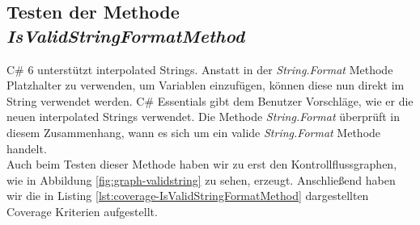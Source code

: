 \subsection{Testen der Methode \textit{IsValidStringFormatMethod}}
C\# 6 unterstützt interpolated Strings. Anstatt in der \textit{String.Format} Methode Platzhalter zu verwenden, um Variablen einzufügen, können diese nun direkt im String verwendet werden.\cite{csharp6} C\# Essentials gibt dem Benutzer Vorschläge, wie er die neuen interpolated Strings verwendet. Die Methode \textit{String.Format} überprüft in diesem Zusammenhang, wann es sich um ein valide \textit{String.Format} Methode handelt.\\
Auch beim Testen dieser Methode haben wir zu erst den Kontrollflussgraphen, wie in Abbildung \ref{fig:graph-validstring} zu sehen, erzeugt. Anschließend haben wir die in Listing \ref{lst:coverage-IsValidStringFormatMethod} dargestellten Coverage Kriterien aufgestellt.


